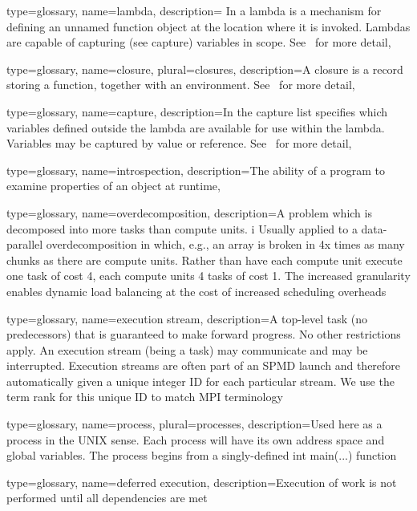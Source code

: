 {
  type=glossary,
  name={lambda},
  description={ In \CC{} a lambda is a mechanism for 
    defining an unnamed function object at the location 
    where it is invoked. Lambdas are capable of capturing (see \gls{capture}) variables in
    scope. See~\cite{lambda} for more detail},
}

{
  type={glossary},
  name={closure},
  plural={closures},
  description={A closure is a record storing a function, together with an
    environment.  See~\cite{closure} for more detail},
}

{
  type=glossary,
  name=capture,
  description={In \CC{} the capture list specifies which variables defined
    outside the lambda are available for use within the lambda. Variables may
    be captured by value or reference.  See~\cite{lambda} for more detail},
}

{
  type=glossary,
  name=introspection,
  description={The ability of a program to examine properties of an object at
    runtime},
}

{
  type=glossary,
  name=overdecomposition,
  description={A problem which is decomposed into more tasks than compute units. i
  Usually applied to a data-parallel overdecomposition in which, e.g., an array
  is broken in 4x times as many chunks as there are compute units.
  Rather than have each compute unit execute one task of cost 4,
  each compute units 4 tasks of cost 1.
  The increased granularity enables dynamic load balancing at the cost of increased 
  scheduling overheads}
}

{
  type=glossary,
  name={execution stream},
  description={A top-level task (no predecessors) that is guaranteed to make forward progress.
  No other restrictions apply. An execution stream (being a \gls{task}) may communicate
  and may be interrupted. Execution streams are often part of an SPMD launch and therefore
  automatically given a unique integer ID for each particular stream. We use the term rank
  for this unique ID to match MPI terminology}
}

{
  type=glossary,
  name={process},
  plural={processes},
  description={Used here as a process in the UNIX sense. Each process will have its own address space and global variables.
    The process begins from a singly-defined int main(...) function}
}

{
  type=glossary,
  name={deferred execution},
  description={Execution of work is not performed until all dependencies are
    met}
  }

